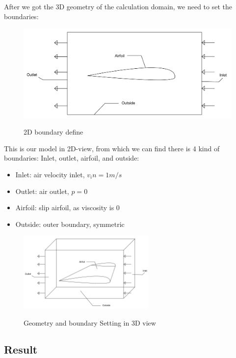 \documentclass[12pt]{article}
\begin{document}
After we got the 3D geometry of the calculation domain, we need to set the boundaries:

\begin{figure}[H]
    \centering
    \includegraphics[width=1\textwidth]{Latex/figure/diagram-2D.jpg}
    \label{IGs.jpg}
    \caption{2D boundary define}
\end{figure}

This is our model in 2D-view, from which we can find there is 4 kind of boundaries: Inlet, outlet, airfoil, and outside:
\begin{itemize}
    \item Inlet: air velocity inlet, $v_in = 1m/s$
    \item Outlet: air outlet, $p=0$
    \item Airfoil: slip airfoil, as viscosity is 0
    \item Outside: outer boundary, symmetric
\end{itemize}


\begin{figure}[H]
    \centering
    \includegraphics[width=0.6\textwidth]{Latex/figure/diagram-3D.jpg}
    \label{IGs.jpg}
    \caption{Geometry and boundary Setting in 3D view}
\end{figure}













\subsection{Result}
\end{document}

